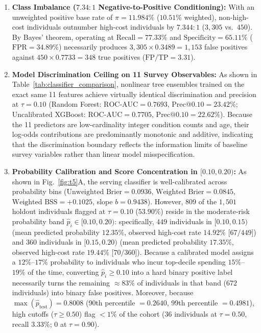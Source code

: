 \documentclass[runningheads]{llncs}
\begin{document}
\begin{enumerate}
    \item \textbf{Class Imbalance ($7.34:1$ Negative-to-Positive Conditioning):} With an unweighted positive base rate of $\pi = 11.984\%$ ($10.51\%$ weighted), non-high-cost individuals outnumber high-cost individuals by $7.344 : 1$ ($3,305$ vs.\ $450$). By Bayes' theorem, operating at $\text{Recall} = 77.33\%$ and $\text{Specificity} = 65.11\%$ ($\text{FPR} = 34.89\%$) necessarily produces $3,305 \times 0.3489 = 1,153$ false positives against $450 \times 0.7733 = 348$ true positives ($\text{FP}/\text{TP} = 3.31$).
    \item \textbf{Model Discrimination Ceiling on 11 Survey Observables:} As shown in Table~\ref{tab:classifier_comparison}, nonlinear tree ensembles trained on the exact same 11 features achieve virtually identical discrimination and precision at $\tau = 0.10$ (Random Forest: $\text{ROC-AUC} = 0.7693$, $\text{Prec@0.10} = 23.42\%$; Uncalibrated XGBoost: $\text{ROC-AUC} = 0.7705$, $\text{Prec@0.10} = 22.62\%$). Because the 11 predictors are low-cardinality integer condition counts and age, their log-odds contributions are predominantly monotonic and additive, indicating that the discrimination boundary reflects the information limits of baseline survey variables rather than linear model misspecification.
    \item \textbf{Probability Calibration and Score Concentration in $[0.10, 0.20)$:} As shown in Fig.~\ref{fig:t5}A, the serving classifier is well-calibrated across probability bins ($\text{Unweighted Brier} = 0.0936$, $\text{Weighted Brier} = 0.0845$, $\text{Weighted BSS} = +0.1025$, slope $b = 0.9438$). However, $809$ of the $1,501$ holdout individuals flagged at $\tau = 0.10$ ($53.90\%$) reside in the moderate-risk probability band $\hat{p}_i \in [0.10, 0.20)$: specifically, $449$ individuals in $[0.10, 0.15)$ (mean predicted probability $12.35\%$, observed high-cost rate $14.92\%$ [$67/449$]) and $360$ individuals in $[0.15, 0.20)$ (mean predicted probability $17.35\%$, observed high-cost rate $19.44\%$ [$70/360$]). Because a calibrated model assigns a $12\%$--$17\%$ probability to individuals who incur top-decile spending $15\%$--$19\%$ of the time, converting $\hat{p}_i \ge 0.10$ into a hard binary positive label necessarily turns the remaining $\approx 83\%$ of individuals in that band ($672$ individuals) into binary false positives. Moreover, because $\max(\hat{p}_{\text{test}}) = 0.8008$ (90th percentile $= 0.2640$, 99th percentile $= 0.4981$), high cutoffs ($\tau \ge 0.50$) flag $<1\%$ of the cohort ($36$ individuals at $\tau = 0.50$, recall $3.33\%$; $0$ at $\tau = 0.90$).

\end{enumerate}
\end{document}
